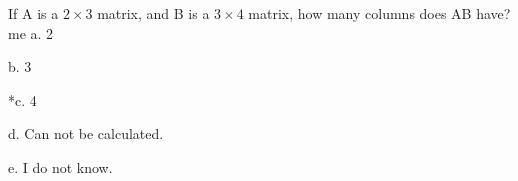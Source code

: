 
If A is a \(2\times3\) matrix, and B is a \(3\times4\) matrix, how many columns does AB have?\\
me
a. 2

b. 3

*c. 4

d. Can not be calculated.

e. I do not know.\\
